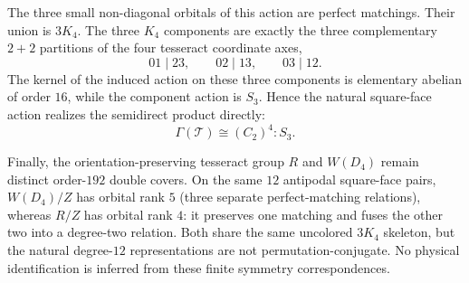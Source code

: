 The three small non-diagonal orbitals of this action are perfect matchings.
Their union is $3K_4$.  The three $K_4$ components are exactly the three
complementary $2+2$ partitions of the four tesseract coordinate axes,
\[
  01\mid23,\qquad 02\mid13,\qquad 03\mid12.
\]
The kernel of the induced action on these three components is elementary
abelian of order $16$, while the component action is $S_3$.  Hence the natural
square-face action realizes the semidirect product directly:
\[
  \Gamma(\mathcal T)\cong (C_2)^4:S_3.
\]

Finally, the orientation-preserving tesseract group $R$ and $W(D_4)$ remain
distinct order-$192$ double covers.  On the same $12$ antipodal square-face
pairs, $W(D_4)/Z$ has orbital rank $5$ (three separate perfect-matching
relations), whereas $R/Z$ has orbital rank $4$: it preserves one matching and
fuses the other two into a degree-two relation.  Both share the same uncolored
$3K_4$ skeleton, but the natural degree-$12$ representations are not
permutation-conjugate.  No physical identification is inferred from these
finite symmetry correspondences.
